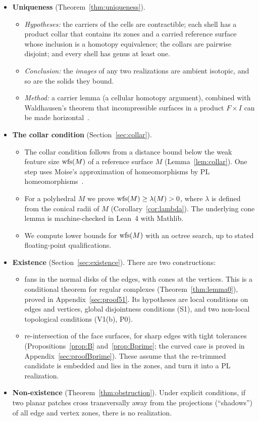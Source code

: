 \begin{itemize}
\item \textbf{Uniqueness} (Theorem~\ref{thm:uniqueness}).
  \begin{itemize}
  \item \emph{Hypotheses:} the carriers of the cells are contractible; each shell has a product collar that contains
  its zones and a carried reference surface whose inclusion is a homotopy equivalence; the collars are pairwise
  disjoint; and every shell has genus at least one.
  \item \emph{Conclusion:} the \emph{images} of any two realizations are ambient isotopic, and so are the solids they
  bound.
  \item \emph{Method:} a carrier lemma (a cellular homotopy argument), combined with Waldhausen's theorem that
  incompressible surfaces in a product $F\times I$ can be made horizontal~\cite[Prop.~3.1]{Waldhausen68}.
  \end{itemize}
\item \textbf{The collar condition} (Section~\ref{sec:collar}).
  \begin{itemize}
  \item The collar condition follows from a distance bound below the weak feature size $\operatorname{wfs}(M)$ of a reference
  surface $M$ (Lemma~\ref{lem:collar}). One step uses Moise's approximation of homeomorphisms by PL
  homeomorphisms~\cite[Thm.~35.2]{Moise77}.
  \item For a polyhedral $M$ we prove $\operatorname{wfs}(M)\ge\lambda(M)>0$, where $\lambda$ is defined from the conical radii of
  $M$ (Corollary~\ref{cor:lambda}). The underlying cone lemma is machine-checked in Lean~4 with Mathlib.
  \item We compute lower bounds for $\operatorname{wfs}(M)$ with an octree search, up to stated floating-point qualifications.
  \end{itemize}
\item \textbf{Existence} (Section~\ref{sec:existence}). There are two constructions:
  \begin{itemize}
  \item fans in the normal disks of the edges, with cones at the vertices. This is a conditional theorem for regular
  complexes (Theorem~\ref{thm:lemma0}), proved in Appendix~\ref{sec:proof51}.  Its hypotheses are local conditions on edges and
  vertices, global disjointness conditions (S1), and two non-local topological conditions (V1(b), P0).
  \item re-intersection of the face surfaces, for sharp edges with tight tolerances (Propositions~\ref{prop:B}
  and~\ref{prop:Bprime}; the curved case is proved in Appendix~\ref{sec:proofBprime}). These assume that the re-trimmed
  candidate is embedded and lies in the zones, and turn it into a PL realization.
  \end{itemize}
\item \textbf{Non-existence} (Theorem~\ref{thm:obstruction}). Under explicit conditions, if two planar patches cross
transversally away from the projections (``shadows'') of all edge and vertex zones, there is no realization.
\end{itemize}

